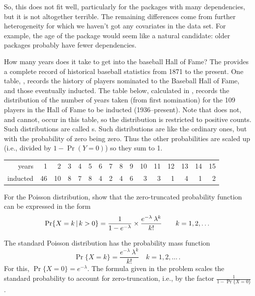 \documentclass[10pt]{report}\usepackage[]{graphicx}\usepackage[]{color}
\newenvironment{knitrout}{}{} %
\renewenvironment{knitrout}{\small\renewcommand{\baselinestretch}{.85}}{} %
\begin{document}
\begin{Exercises}
\begin{enumerate*}
\begin{ans}
\begin{knitrout}
\end{knitrout}
      So, this does not fit well, particularly for the packages with many dependencies, but
      it is not altogether terrible.
      The remaining differences come from further heterogeneity for which we haven't got any covariates in the data set. 
      For example, the age of the package would seem like a natural candidate: older packages probably have fewer dependencies.
      \end{ans}
      
    \end{enumerate*}

\exercise\exhard How many years does it take to get into the baseball Hall of Fame?
  The  provides a complete record of historical baseball statistics from 1871 to
  the present.  One table, , records the history of players nominated to
  the Baseball Hall of Fame, and those eventually inducted.  The table below, calculated
  in , records the distribution of the number of years
  taken (from first nomination)
  for the 109 players in the Hall of Fame to be inducted (1936--present).
  Note that  does not, and cannot, occur in this table, so the distribution
  is restricted to positive counts.  Such distributions are called s.
  Such distributions are like the ordinary ones, but with the probability of zero being zero.
  Thus the other probabilities are scaled up (i.e., divided by $1-\Pr(Y=0)$) so they sum to 1.

\begin{tabular}{r|rrrrrrrrrrrrrrr}
  \hline
years    & 1 & 2 & 3 & 4 & 5 & 6 & 7 & 8 & 9 & 10 & 11 & 12 & 13 & 14 & 15 \\
inducted &  46 &  10 &   8 &   7 &   8 &   4 &   2 &   4 &   6 &   3 &   3 &   1 &   4 &   1 &   2 \\
   \hline
\end{tabular}

    \begin{enumerate*}
      \item For the Poisson distribution, show that the zero-truncated probability function can be expressed in the
      form
			\begin{equation*}
			\Pr \{ X = k \, | \, k>0\} =
			  \frac{1}{1-e^{-\lambda}} \times
			  \frac{ e^{ - \lambda } \:  \lambda^k } { k ! }
			  \quad\quad k = 1, 2, \dots
			\end{equation*}
			\begin{ans}
			The standard Poisson distribution has the probability mass function 
			$$
			\Pr \{ X = k \} =  \frac{ e^{ - \lambda } \:  \lambda^k } { k ! } \quad k = 1, 2, \dots \period
			$$
			For this, $\Pr \{ X = 0 \} =  e^{ - \lambda }$. 
			The formula given in the problem
			scales the standard probability to account for zero-truncation, i.e., by the factor
			$\frac{1}{1-\Pr \{ X = 0 \}}$.
			\end{ans}
			


\end{enumerate*}
\end{Exercises}
\end{document}
